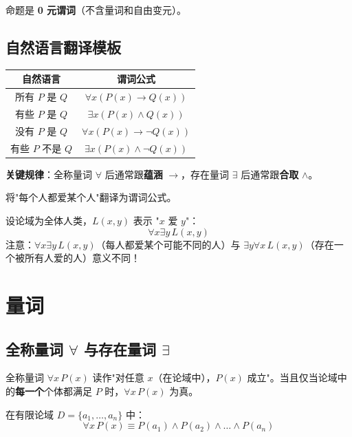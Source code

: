 命题是 \textbf{0 元谓词}（不含量词和自由变元）。

\subsection{自然语言翻译模板}

\begin{center}
\begin{tabular}{c|c}
\toprule
自然语言 & 谓词公式 \\
\midrule
所有 $P$ 是 $Q$ & $\forall x (P(x) \rightarrow Q(x))$ \\
有些 $P$ 是 $Q$ & $\exists x (P(x) \land Q(x))$ \\
没有 $P$ 是 $Q$ & $\forall x (P(x) \rightarrow \neg Q(x))$ \\
有些 $P$ 不是 $Q$ & $\exists x (P(x) \land \neg Q(x))$ \\
\bottomrule
\end{tabular}
\end{center}

\textbf{关键规律}：全称量词 $\forall$ 后通常跟\textbf{蕴涵} $\rightarrow$，存在量词 $\exists$ 后通常跟\textbf{合取} $\land$。

\begin{example}
将"每个人都爱某个人"翻译为谓词公式。

设论域为全体人类，$L(x,y)$ 表示 "$x$ 爱 $y$"：
\[\forall x \exists y \, L(x,y)\]
注意：$\forall x \exists y \, L(x,y)$（每人都爱某个可能不同的人）与 $\exists y \forall x \, L(x,y)$（存在一个被所有人爱的人）意义不同！
\end{example}

\section{量词}

\subsection{全称量词 $\forall$ 与存在量词 $\exists$}

\begin{mydefinition}{全称量词}
$\forall x \, P(x)$ 读作"对任意 $x$（在论域中），$P(x)$ 成立"。当且仅当论域中的\textbf{每一个}个体都满足 $P$ 时，$\forall x \, P(x)$ 为真。

在有限论域 $D = \{a_1,\dots,a_n\}$ 中：
\[\forall x \, P(x) \equiv P(a_1) \land P(a_2) \land \dots \land P(a_n)\]
\end{mydefinition}


